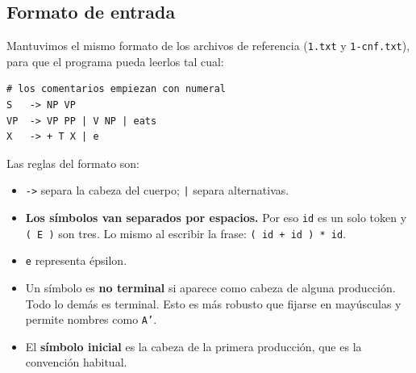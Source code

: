 \documentclass[11pt,a4paper]{article}
\newcommand{\gram}[1]{\texttt{#1}}
\begin{document}
\begin{center}
\end{center}

\subsection{Formato de entrada}

Mantuvimos el mismo formato de los archivos de referencia
(\texttt{1.txt} y \texttt{1-cnf.txt}), para que el programa pueda leerlos tal
cual:

\begin{lstlisting}
# los comentarios empiezan con numeral
S   -> NP VP
VP  -> VP PP | V NP | eats
X   -> + T X | e
\end{lstlisting}

Las reglas del formato son:

\begin{itemize}[leftmargin=*]
  \item \gram{->} separa la cabeza del cuerpo; \gram{|} separa alternativas.
  \item \textbf{Los símbolos van separados por espacios.} Por eso \gram{id} es
  un solo token y \gram{( E )} son tres. Lo mismo al escribir la frase:
  \gram{( id + id ) * id}.
  \item \gram{e} representa épsilon.
  \item Un símbolo es \textbf{no terminal} si aparece como cabeza de alguna
  producción. Todo lo demás es terminal. Esto es más robusto que fijarse en
  mayúsculas y permite nombres como \gram{A'}.
  \item El \textbf{símbolo inicial} es la cabeza de la primera producción, que
  es la convención habitual.
\end{itemize}
\end{document}
